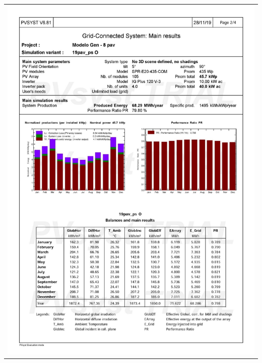 \begin{table}[H]
    \centering
    \begin{tabular}{l}
        \includegraphics[width=\textwidth]{figures/attachments/resultpv34.jpg}
    \end{tabular}
\end{table}